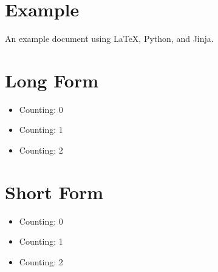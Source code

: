 \documentclass{article}
\begin{document}
\section{Example}
An example document using \LaTeX, Python, and Jinja.

\section{Long Form}
\begin{itemize}
  \item Counting: 0
  \item Counting: 1
  \item Counting: 2
\end{itemize}

\section{Short Form}

\begin{itemize}
  \item Counting: 0
  \item Counting: 1
  \item Counting: 2
\end{itemize}
\end{document}
